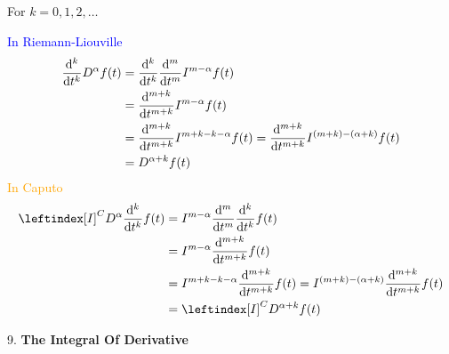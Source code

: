 For $k = 0,1,2,\dots$

\textcolor{blue}{In Riemann-Liouville}
\begin{align*}
    \dv[k]{}{t} D^{\alpha} f(t) &=  \dv[k]{}{t} \dv[m]{}{t} I^{m-\alpha} f(t) 
    \\
    &= \dv[m+k]{}{t} I^{m-\alpha} f(t) 
    \\
    &= \dv[m+k]{}{t} I^{m+k-k-\alpha} f(t) = \dv[m+k]{}{t} I^{(m+k)-(\alpha+k)} f(t) 
    \\
    &= D^{\alpha+k} f(t)
\end{align*}
\textcolor{orange}{In Caputo} 
\begin{align*}
    \leftindex[I]^C {D^{\alpha}} \dv[k]{}{t}f(t) &= I^{m-\alpha}\dv[m]{}{t}\dv[k]{}{t} f(t) 
    \\
    &= I^{m-\alpha}\dv[m+k]{}{t} f(t) 
    \\
    &= I^{m+k-k-\alpha}\dv[m+k]{}{t} f(t) = I^{(m+k)-(\alpha+k)}\dv[m+k]{}{t} f(t) 
    \\
    &= \leftindex[I]^C {D^{\alpha+k}} f(t)
\end{align*}
\newpage

\textcolor{theme}{9.}\textbf{ The Integral Of Derivative}

